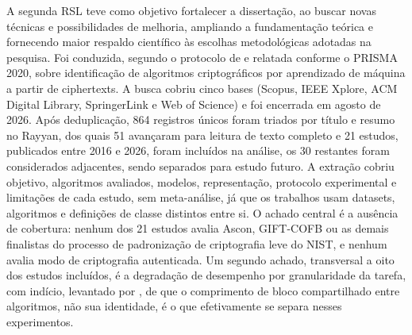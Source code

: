 \begin{tarefac}
A segunda RSL teve como objetivo fortalecer a dissertação, ao buscar novas técnicas e possibilidades de melhoria, ampliando a fundamentação teórica e fornecendo maior respaldo científico às escolhas metodológicas adotadas na pesquisa. Foi conduzida, segundo o protocolo de \citet{kitchenham_charters_2007} e relatada conforme o PRISMA 2020, sobre identificação de algoritmos criptográficos por aprendizado de máquina a partir de ciphertexts. A busca cobriu cinco bases (Scopus, IEEE Xplore, ACM Digital Library, SpringerLink e Web of Science) e foi encerrada em agosto de 2026. Após deduplicação, 864 registros únicos foram triados por título e resumo no Rayyan, dos quais 51 avançaram para leitura de texto completo e 21 estudos, publicados entre 2016 e 2026, foram incluídos na análise, os 30 restantes foram considerados adjacentes, sendo separados para estudo futuro. A extração cobriu objetivo, algoritmos avaliados, modelos, representação, protocolo experimental e limitações de cada estudo, sem meta-análise, já que os trabalhos usam datasets, algoritmos e definições de classe distintos entre si. O achado central é a ausência de cobertura: nenhum dos 21 estudos avalia Ascon, GIFT-COFB ou as demais finalistas do processo de padronização de criptografia leve do NIST, e nenhum avalia modo de criptografia autenticada. Um segundo achado, transversal a oito dos estudos incluídos, é a degradação de desempenho por granularidade da tarefa, com indício, levantado por \citet{tan_ji_2016}, de que o comprimento de bloco compartilhado entre algoritmos, não sua identidade, é o que efetivamente se separa nesses experimentos.


\end{tarefac}






